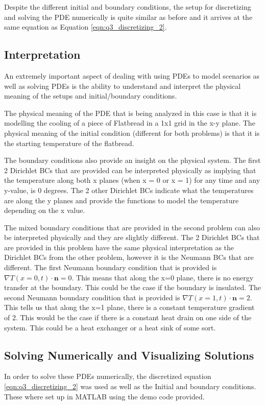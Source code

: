 \documentclass[12pt]{article}
\begin{document}
Despite the different initial and boundary conditions, the setup for discretizing and solving the PDE numerically is quite similar as before and it arrives at the same equation as Equation \ref{eqn:q3_discretizing_2}.

\subsection{Interpretation}
An extremely important aspect of dealing with using PDEs to model scenarios as well as solving PDEs is the ability to understand and interpret the physical meaning of the setups and initial/boundary conditions. 

The physical meaning of the PDE that is being analyzed in this case is that it is modelling the cooling of a piece of Flatbread in a 1x1 grid in the x-y plane. The physical meaning of the initial condition (different for both problems) is that it is the starting temperature of the flatbread.

The boundary conditions also provide an insight on the physical system. The first 2 Dirichlet BCs that are provided can be interpreted physically as implying that the temperature along both x planes (when x = 0 or x = 1) for any time and any y-value, is 0 degrees. The 2 other Dirichlet BCs indicate what the temperatures are along the y planes and provide the functions to model the temperature depending on the x value.

The mixed boundary conditions that are provided in the second problem can also be interpreted physically and they are slightly different. The 2 Dirichlet BCs that are provided in this problem have the same physical interpretation as the Dirichlet BCs from the other problem, however it is the Neumann BCs that are different. The first Neumann boundary condition that is provided is $\nabla T(x = 0, t) \cdot \mathbf{n} = 0$. This means that along the x=0 plane, there is no energy transfer at the boundary. This could be the case if the boundary is insulated. The second Neumann boundary condition that is provided is $\nabla T(x=1, t) \cdot \mathbf{n} = 2$. This tells us that along the x=1 plane, there is a constant temperature gradient of 2. This would be the case if there is a constant heat drain on one side of the system. This could be a heat exchanger or a heat sink of some sort.

\subsection{Solving Numerically and Visualizing Solutions}
In order to solve these PDEs numerically, the discretized equation \ref{eqn:q3_discretizing_2} was used as well as the Initial and boundary conditions. These where set up in MATLAB using the demo code provided. 
\end{document}
